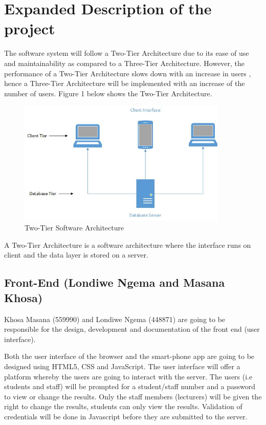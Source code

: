 \documentclass[10pt,onecolumn]{lab}
\begin{document}
\section{Expanded Description of the project}

The software system will follow a Two-Tier Architecture due to its ease of use and maintainability as compared to a Three-Tier Architecture. However, the performance of a Two-Tier Architecture slows down with an increase in users \cite{ref3}, hence a Three-Tier Architecture will be implemented with an increase of the number of users. Figure 1 below shows the Two-Tier Architecture.   
\begin{center}
\begin{figure}[h]
\centering
\includegraphics[width=10cm]{Two-Tier}
\caption{Two-Tier Software Architecture}
\end{figure}
\end{center}


A Two-Tier Architecture is a software architecture where the interface runs on client and the data layer is stored on a server\cite{ref4}.
\subsection{Front-End (Londiwe Ngema and Masana Khosa)}

Khosa Masana (559990) and Londiwe Ngema (448871) are going to be responsible for the design, development and documentation of the front end (user interface).

Both the user interface of the browser and the smart-phone app are going to be designed using HTML5, CSS and JavaScript. The user interface will offer a platform whereby the users are going to interact with the server. The users (i.e students and staff) will be prompted for a student/staff number and a password to view or change the results. Only the staff members (lecturers) will be given the right to change the results, students can only view the results. Validation of credentials will be done in Javascript before they are submitted to the server.  
\end{document}
